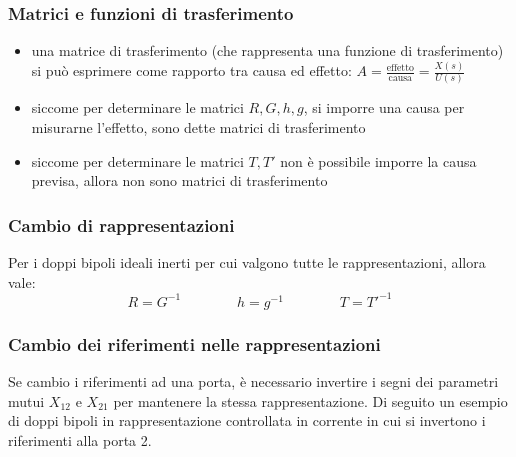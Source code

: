 \documentclass[a4paper]{article}
\begin{document}
\subsubsection*{Matrici e funzioni di trasferimento}
\begin{itemize}
	\item una matrice di trasferimento (che rappresenta una funzione di trasferimento) si può esprimere come rapporto tra causa
	ed effetto: \(A = \frac{\text{effetto}}{\text{causa}} = \frac{X(s)}{U(s)}\)
	\item siccome per determinare le matrici \(R, G, h, g\), si imporre una causa per misurarne l'effetto, sono dette matrici di trasferimento
	\item siccome per determinare le matrici \(T, T'\) non è possibile imporre la causa previsa, allora non sono matrici di trasferimento
\end{itemize}

\subsubsection*{Cambio di rappresentazioni}
Per i doppi bipoli ideali inerti per cui valgono tutte le rappresentazioni, allora vale:
\[R = G^{-1} \qquad\qquad h = g^{-1} \qquad\qquad T = T'^{-1}\]

\subsubsection*{Cambio dei riferimenti nelle rappresentazioni}
Se cambio i riferimenti ad una porta, è necessario invertire i segni dei parametri mutui \(X_{12}\) e \(X_{21}\) per mantenere
la stessa rappresentazione. Di seguito un esempio di doppi bipoli in rappresentazione controllata in corrente in cui si invertono
i riferimenti alla porta 2. 
\end{document}

